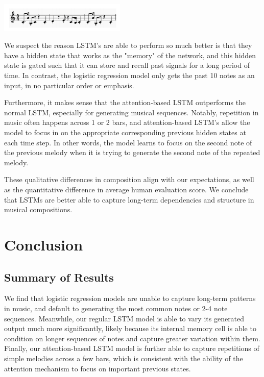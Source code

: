 \documentclass[twoside,twocolumn]{article}
\begin{document}
\includegraphics[width = 0.45\textwidth]{images/magenta_composition.png}

We suspect the reason LSTM's are able to perform so much better is that they have a hidden state that works as the "memory" of the network, and this hidden state is gated such that it can store and recall past signals for a long period of time. In contrast, the logistic regression model only gets the past 10 notes as an input, in no particular order or emphasis.

Furthermore, it makes sense that the attention-based LSTM outperforms the normal LSTM, especially for generating musical sequences. Notably, repetition in music often happens across 1 or 2 bars, and attention-based LSTM's allow the model to focus in on the appropriate corresponding previous hidden states at each time step. In other words, the model learns to focus on the second note of the previous melody when it is trying to generate the second note of the repeated melody.

These qualitative differences in composition align with our expectations, as well as the quantitative difference in average human
evaluation score. We conclude that LSTMs are better able to capture long-term dependencies and structure in musical compositions.




\section{Conclusion}

\subsection{Summary of Results}

We find that logistic regression models are unable to capture long-term patterns in music, and default to generating the most common notes or 2-4 note sequences. Meanwhile, our regular LSTM model is able to vary its generated output much more significantly, likely because its internal memory cell is able to condition on longer sequences of notes and capture greater variation within them. Finally, our attention-based LSTM model is further able to capture repetitions of simple melodies across a few bars, which is consistent with the ability of the attention mechanism to focus on important previous states.
\end{document}
